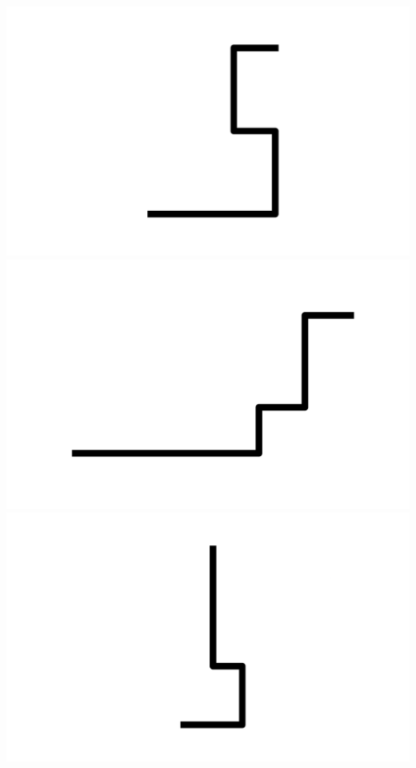 \documentclass[]{report}
\begin{document}
\includegraphics[scale=.1]{pictures/21/state_cluster_shapes_10.pdf} 
\includegraphics[scale=.1]{pictures/21/state_cluster_shapes_11.pdf} 
\includegraphics[scale=.1]{pictures/21/state_cluster_shapes_12.pdf} 
\end{document}
